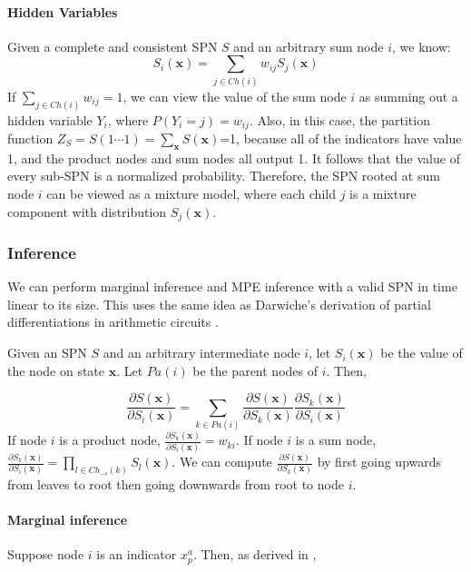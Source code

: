 \documentclass[10pt, titlepage]{article}
\theoremstyle{definition}
\newcommand\mb{\mathbf}
\begin{document}
\paragraph{Hidden Variables}
Given a complete and consistent SPN $S$ and an arbitrary sum node $i$, we know:
\begin{equation}
S_i(\mb{x})=\sum_{j\in Ch(i)}w_{ij}S_j(\mb{x})
\end{equation}
If $\sum_{j\in Ch(i)}w_{ij}=1$, we can view the value of the sum node $i$ as summing out a hidden variable $Y_i$, where $P(Y_i=j)=w_{ij}$. Also, in this case, the partition function $Z_S=S(1\cdots1)=\sum_{\mb{x}}S(\mb{x})$=1, because all of the indicators have value 1, and the product nodes and sum nodes all output 1. It follows that the value of every sub-SPN is a normalized probability. Therefore, the SPN rooted at sum node $i$ can be viewed as a mixture model, where each child $j$ is a mixture component with distribution $S_j(\mb{x})$.

\subsubsection{Inference}\label{inf}
We can perform marginal inference and MPE inference with a valid SPN in time linear to its size. This uses the same idea as Darwiche's derivation of partial differentiations in arithmetic circuits \cite{darwiche2003differential}.

Given an SPN $S$ and an arbitrary intermediate node $i$, let $S_i(\mb{x})$ be the value of the node on state $\mb{x}$. Let $Pa(i)$ be the parent nodes of $i$. Then,

\begin{equation}
\label{psx}
    \frac{\partial S(\mb{x})}{\partial S_i(\mb{x})}= \sum_{k\in Pa(i)}\frac{\partial S(\mb{x})}{\partial S_k(\mb{x})} \frac{\partial S_k(\mb{x})}{\partial S_i(\mb{x})}
\end{equation}
If node $i$ is a product node, $\frac{\partial S_k(\mb{x})}{\partial S_i(\mb{x})}=w_{ki}$. If node $i$ is a sum node, $\frac{\partial S_k(\mb{x})}{\partial S_i(\mb{x})}=\prod_{l\in Ch_{-i}(k)}S_l(\mb{x})$. We can compute $\frac{\partial S(\mb{x})}{\partial S_k(\mb{x})}$ by first going upwards from leaves to root then going downwards from root to node $i$. 

\paragraph{Marginal inference}\label{if:mg}
Suppose node $i$ is an indicator $x_p^a$. Then, as derived in \cite{darwiche2003differential},
\end{document}
